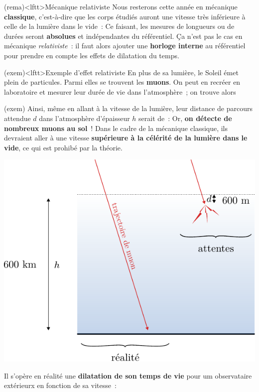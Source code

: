 \documentclass[../../main/main.tex]{subfiles}
\begin{document}
\begin{tcb}(rema)<lftt>{Mécanique relativiste}
	Nous resterons cette année en mécanique \textbf{classique}, c'est-à-dire que
	les corps étudiés auront une vitesse très inférieure à celle de la lumière
	dans le vide~:
	\psw{%
		\[
			v \ll c = \SI{3.00e8}{m.s^{-1}}
		\]
	}%
	Ce faisant, les mesures de longueurs ou de durées seront
	\textbf{absolues} et indépendantes du référentiel. Ça n'est pas le cas en
	mécanique \textit{relativiste}~: il faut alors ajouter une \textbf{horloge
		interne} au référentiel pour prendre en compte les effets de dilatation du
	temps.
\end{tcb}

\begin{tcb}[breakable](exem)<lftt>{Exemple d'effet relativiste}
	En plus de sa lumière, le Soleil émet plein de particules. Parmi elles se
	trouvent les \textbf{muons}. On peut en recréer en laboratoire et mesurer leur
	durée de vie dans l'atmosphère~; on trouve alors
	\psw{%
		\[
			\tau\ind{labo} = \SI{2.0}{\micro s}
		\]
	}%
	\begin{isd}(exem)
		Ainsi, même en allant à la vitesse de la lumière, leur distance de parcours
		attendue $d$ dans l'atmosphère d'épaisseur $h$ serait de~:
		\psw{%
			\[
				d = c\tau\ind{labo} = \SI{600}{m} \ll h = \SI{600}{km}
			\]
		}%
		Or, \textbf{on détecte de nombreux muons au sol}~! Dans le cadre de la
		mécanique classique, ils devraient aller à une vitesse \textbf{supérieure à la
			célérité de la lumière dans le vide}, ce qui est prohibé par la théorie.
		\tcblower
		\begin{center}
			\includegraphics[width=\linewidth]{relat_rst}
		\end{center}
	\end{isd}
	Il s'opère en réalité une \textbf{dilatation de son temps de vie} pour um
	observataire extérieurx en fonction de sa vitesse~:
	\psw{%
		\[
			\tau\ind{propre} = \gamma\,\tau\ind{labo}
			\qav
			\gamma = \frac{1}{\sqrt{1-\dfrac{v^2}{c^2}}}
			\quad \Ra \quad
			\xul{\tau\ind{propre} = \SI{82}{\micro s}}
			\quad \Ra \quad
			\xul{d\ind{réelle} = \SI{27.0}{km}}
		\]
	}%
	\vspace{-25pt}
\end{tcb}
\end{document}
